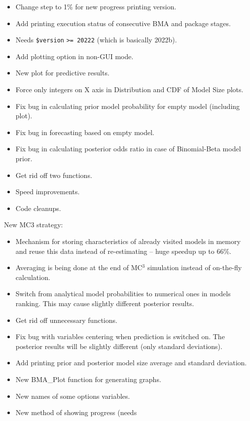\documentclass[article]{repec}
\begin{document}
{\begin{description}
\begin{itemize}
				and appears in ranking.
			\item Change step to 1\% for new progress
				printing version.
			\item Add printing execution status of consecutive
				BMA and package stages.
			\item Needs \lstinline!$version! \footnotesize{\texttt{>= 20222}}
				(which is basically 2022b).
			\item Add plotting option in non-GUI mode.
			\item New plot for predictive results.
			\item Force only integers on X axis in Distribution
				and CDF of Model Size plots.
			\item Fix bug in calculating prior model probability
				for empty model (including plot).
			\item Fix bug in forecasting based on empty model.
			\item Fix bug in calculating posterior odds ratio
				in case of Binomial-Beta model prior.
			\item Get rid off two functions.
			\item Speed improvements.
			\item Code cleanups.
		\end{itemize}
	\item[3.0] New MC3 strategy:
		\begin{itemize}
			\item Mechanism for storing characteristics 
				of already visited models in memory and
				reuse this data instead of re-estimating
				-- huge speedup up to 66\%.
			\item Averaging is being done at the end of MC$^3$ simulation
				instead of on-the-fly calculation. 
			\item Switch from analytical model probabilities
				to numerical ones in models ranking. This may cause
				slightly different posterior results.
			\item Get rid off unnecessary functions.
			\item Fix bug with variables centering when 
				prediction is switched on. The posterior results
				will be slightly different (only standard deviations).
			\item Add printing prior and posterior model size
				average and standard deviation.
			\item New BMA\_Plot function for generating graphs.
			\item New names of some options variables.
			\item New method of showing progress (needs

\end{itemize}
\end{description}}
\end{document}
